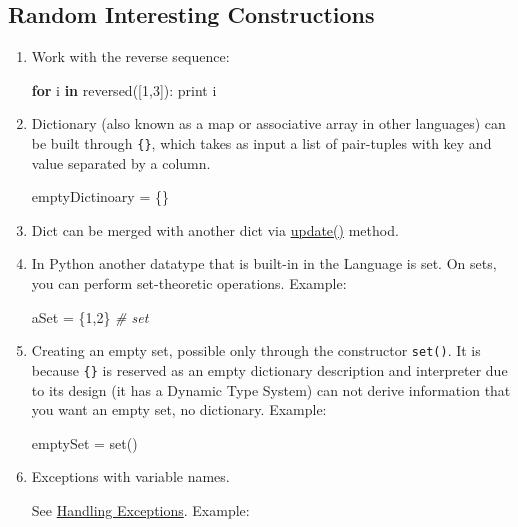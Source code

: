\documentclass[
]{article}
\newenvironment{Shaded}{}{}
\newcommand{\BuiltInTok}[1]{#1}
\newcommand{\CommentTok}[1]{\textcolor[rgb]{0.38,0.63,0.69}{\textit{#1}}}
\newcommand{\ControlFlowTok}[1]{\textcolor[rgb]{0.00,0.44,0.13}{\textbf{#1}}}
\newcommand{\DecValTok}[1]{\textcolor[rgb]{0.25,0.63,0.44}{#1}}
\newcommand{\KeywordTok}[1]{\textcolor[rgb]{0.00,0.44,0.13}{\textbf{#1}}}
\newcommand{\NormalTok}[1]{#1}
\newcommand{\OperatorTok}[1]{\textcolor[rgb]{0.40,0.40,0.40}{#1}}
\begin{document}
\hypertarget{random-interesting-constructions}{%
\subsection{Random Interesting
Constructions}\label{random-interesting-constructions}}

\begin{enumerate}
\def\labelenumi{\arabic{enumi}.}
\item
  Work with the reverse sequence:

\begin{Shaded}
\begin{Highlighting}[]
\ControlFlowTok{for}\NormalTok{ i }\KeywordTok{in} \BuiltInTok{reversed}\NormalTok{([}\DecValTok{1}\NormalTok{,}\DecValTok{3}\NormalTok{]): }
    \BuiltInTok{print}\NormalTok{ i  }
\end{Highlighting}
\end{Shaded}
\item
  Dictionary (also known as a map or associative array in other
  languages) can be built through \texttt{\{\}}, which takes as input a
  list of pair-tuples with key and value separated by a column.

\begin{Shaded}
\begin{Highlighting}[]
\NormalTok{emptyDictinoary }\OperatorTok{=}\NormalTok{ \{\}}
\end{Highlighting}
\end{Shaded}
\item
  Dict can be merged with another dict via
  \href{https://docs.python.org/3/library/stdtypes.html?highlight=update\#dict.update}{update()}
  method.
\item
  In Python another datatype that is built-in in the Language is set. On
  sets, you can perform set-theoretic operations. Example:

\begin{Shaded}
\begin{Highlighting}[]
\NormalTok{aSet }\OperatorTok{=}\NormalTok{ \{}\DecValTok{1}\NormalTok{,}\DecValTok{2}\NormalTok{\}   }\CommentTok{\# set}
\end{Highlighting}
\end{Shaded}
\item
  Creating an empty set, possible only through the constructor
  \texttt{set()}. It is because \texttt{\{\}} is reserved as an empty
  dictionary description and interpreter due to its design (it has a
  Dynamic Type System) can not derive information that you want an empty
  set, no dictionary. Example:

\begin{Shaded}
\begin{Highlighting}[]
\NormalTok{emptySet }\OperatorTok{=} \BuiltInTok{set}\NormalTok{()}
\end{Highlighting}
\end{Shaded}
\item
  Exceptions with variable names.

  See
  \href{https://docs.python.org/3/tutorial/errors.html\#handling-exceptions}{Handling
  Exceptions}. Example:
\end{enumerate}
\end{document}

